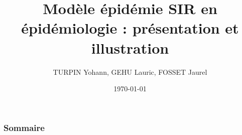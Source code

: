 \documentclass{beamer}
\title{Modèle épidémie SIR en épidémiologie : présentation et illustration}
\author{TURPIN Yohann, GEHU Lauric, FOSSET Jaurel}
\date{\today}
\begin{document}
    
    \frame{\titlepage}

    

    \begin{frame}
        \frametitle{Sommaire}
        \tableofcontents
    \end{frame}


    


    
    
    
    
    
\end{document}
